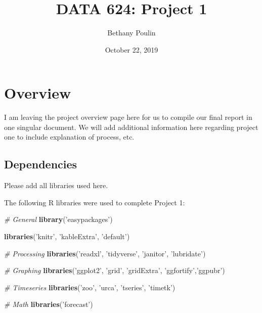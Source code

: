 \documentclass[openany]{book}
\title{DATA 624: Project 1}
\author{Bethany Poulin}
\date{October 22, 2019}
\newenvironment{Shaded}{\begin{snugshade}}{\end{snugshade}}
\newcommand{\CommentTok}[1]{\textcolor[rgb]{0.56,0.35,0.01}{\textit{#1}}}
\newcommand{\KeywordTok}[1]{\textcolor[rgb]{0.13,0.29,0.53}{\textbf{#1}}}
\newcommand{\NormalTok}[1]{#1}
\newcommand{\StringTok}[1]{\textcolor[rgb]{0.31,0.60,0.02}{#1}}
\renewenvironment{quote}{\begin{myquote}}{\end{myquote}}
\begin{document}
\maketitle

{
\setcounter{tocdepth}{1}
\tableofcontents
}
\hypertarget{overview}{%
\chapter*{Overview}\label{overview}}

\begin{quote}
I am leaving the project overview page here for us to compile our final
report in one singular document. We will add additional information here
regarding project one to include explanation of process, etc.
\end{quote}

\hypertarget{dependencies}{%
\section*{Dependencies}\label{dependencies}}

\begin{quote}
Please add all libraries used here.
\end{quote}

The following R libraries were used to complete Project 1:

\begin{Shaded}
\begin{Highlighting}[]
\CommentTok{# General}
\KeywordTok{library}\NormalTok{(}\StringTok{'easypackages'}\NormalTok{)}

\KeywordTok{libraries}\NormalTok{(}\StringTok{'knitr'}\NormalTok{, }\StringTok{'kableExtra'}\NormalTok{, }\StringTok{'default'}\NormalTok{)}

\CommentTok{# Processing}
\KeywordTok{libraries}\NormalTok{(}\StringTok{'readxl'}\NormalTok{, }\StringTok{'tidyverse'}\NormalTok{, }\StringTok{'janitor'}\NormalTok{, }\StringTok{'lubridate'}\NormalTok{)}

\CommentTok{# Graphing}
\KeywordTok{libraries}\NormalTok{(}\StringTok{'ggplot2'}\NormalTok{, }\StringTok{'grid'}\NormalTok{, }\StringTok{'gridExtra'}\NormalTok{, }\StringTok{'ggfortify'}\NormalTok{,}\StringTok{'ggpubr'}\NormalTok{)}

\CommentTok{# Timeseries }
\KeywordTok{libraries}\NormalTok{(}\StringTok{'zoo'}\NormalTok{, }\StringTok{'urca'}\NormalTok{, }\StringTok{'tseries'}\NormalTok{, }\StringTok{'timetk'}\NormalTok{)}

\CommentTok{# Math}
\KeywordTok{libraries}\NormalTok{(}\StringTok{'forecast'}\NormalTok{)}
\end{Highlighting}
\end{Shaded}
\end{document}
